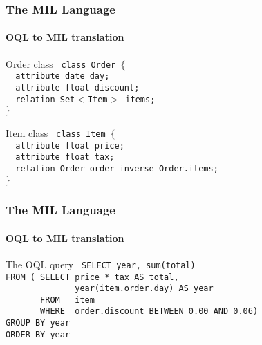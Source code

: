 \documentclass{beamer}
\begin{document}
\begin{frame}
  \frametitle{The MIL Language}
  \framesubtitle{OQL to MIL translation}

  \begin{block}{Order class}
{\tt
class Order $\lbrace$ \\
\ \ attribute date day; \\
\ \ attribute float discount; \\
\ \ relation Set$<$Item$>$ items; \\
$\rbrace$
}
  \end{block}

  \pause

  \begin{block}{Item class}
{\tt
class Item $\lbrace$ \\
\ \ attribute float price; \\
\ \ attribute float tax; \\
\ \ relation Order order inverse Order.items; \\
$\rbrace$
}
  \end{block}

\end{frame}

\begin{frame}
  \frametitle{The MIL Language}
  \framesubtitle{OQL to MIL translation}

  \begin{block}{The OQL query}
{\tt
SELECT year, sum(total) \\
FROM ( SELECT price * tax AS total, \\
\ \ \ \ \ \ \ \ \ \ \ \ \ \ year(item.order.day) AS year \\
\ \ \ \ \ \ \ FROM\ \ \ item \\
\ \ \ \ \ \ \ WHERE\ \ order.discount BETWEEN 0.00 AND 0.06) \\
GROUP BY year \\
ORDER BY year
}
  \end{block}

\end{frame}
\end{document}
